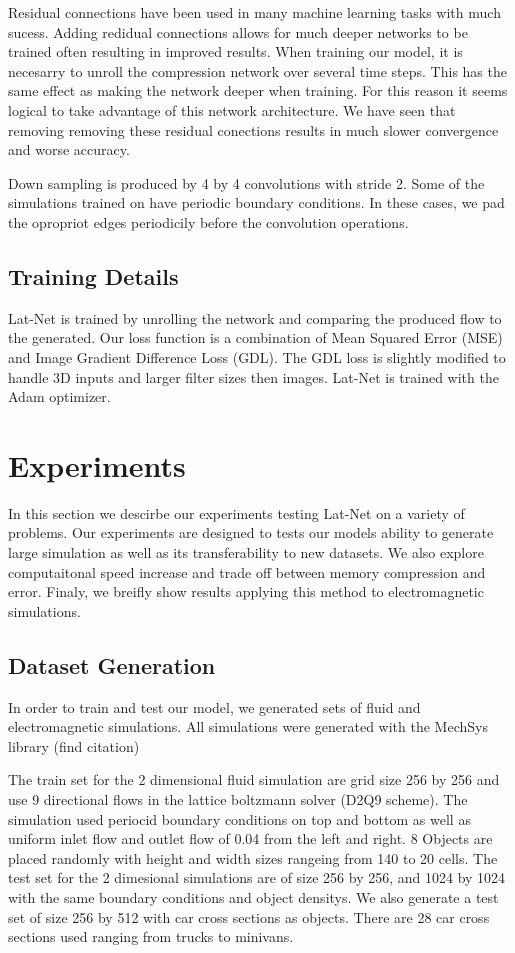 \documentclass{article}
\begin{document}
Residual connections have been used in many machine learning tasks with much sucess. Adding redidual connections allows for much deeper networks to be trained often resulting in improved results. When training our model, it is necesarry to unroll the compression network over several time steps. This has the same effect as making the network deeper when training. For this reason it seems logical to take advantage of this network architecture. We have seen that removing removing these residual conections results in much slower convergence and worse accuracy.

Down sampling is produced by 4 by 4 convolutions with stride 2. Some of the simulations trained on have periodic boundary conditions. In these cases, we pad the opropriot edges periodicily before the convolution operations.


\subsection{Training Details}

Lat-Net is trained by unrolling the network and comparing the produced flow to the generated. Our loss function is a combination of Mean Squared Error (MSE) and Image Gradient Difference Loss (GDL)\cite{mathieu2015deep}. The GDL loss is slightly modified to handle 3D inputs and larger filter sizes then images. Lat-Net is trained with the Adam optimizer\cite{kingma2014adam}.

\section{Experiments}

In this section we descirbe our experiments testing Lat-Net on a variety of problems. Our experiments are designed to tests our models ability to generate large simulation as well as its transferability to new datasets. We also explore computaitonal speed increase and trade off between memory compression and error. Finaly, we breifly show results applying this method to electromagnetic simulations.

\subsection{Dataset Generation}
In order to train and test our model, we generated sets of fluid and electromagnetic simulations. All simulations were generated with the MechSys library (find citation)

The train set for the 2 dimensional fluid simulation are grid size 256 by 256 and use 9 directional flows in the lattice boltzmann solver (D2Q9 scheme)\cite{guo2013lattice}. The simulation used periocid boundary conditions on top and bottom as well as uniform inlet flow and outlet flow of 0.04 from the left and right. 8 Objects are placed randomly with height and width sizes rangeing from 140 to 20 cells. The test set for the 2 dimesional simulations are of size 256 by 256, and 1024 by 1024 with the same boundary conditions and object densitys. We also generate a test set of size 256 by 512 with car cross sections as objects. There are 28 car cross sections used ranging from trucks to minivans.
\end{document}
